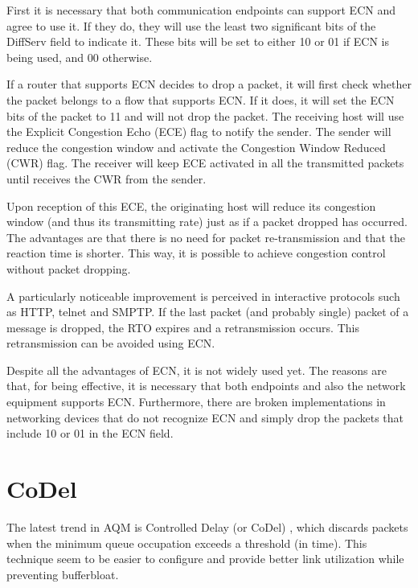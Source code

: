 First it is necessary that both communication endpoints can support ECN and agree to use it.
If they do, they will use the least two significant bits of the DiffServ field to indicate it.
These bits will be set to either 10 or 01 if ECN is being used, and 00 otherwise.

If a router that supports ECN decides to drop a packet, it will first check whether the packet belongs to a flow that supports ECN.
If it does, it will set the ECN bits of the packet to 11 and will not drop the packet.
The receiving host will use the Explicit Congestion Echo (ECE) flag to notify the sender.
The sender will reduce the congestion window and activate the Congestion Window Reduced (CWR) flag.
The receiver will keep ECE activated in all the transmitted packets until receives the CWR from the sender.

Upon reception of this ECE, the originating host will reduce its congestion window (and thus its transmitting rate) just as if a packet dropped has occurred.
The advantages are that there is no need for packet re-transmission and that the reaction time is shorter.
This way, it is possible to achieve congestion control without packet dropping.

A particularly noticeable improvement is perceived in interactive protocols such as HTTP, telnet and SMPTP.
If the last packet (and probably single) packet of a message is dropped, the RTO expires and a retransmission occurs.
This retransmission can be avoided using ECN.

Despite all the advantages of ECN, it is not widely used yet.
The reasons are that, for being effective, it is necessary that both endpoints and also the network equipment supports ECN.
Furthermore, there are broken implementations in networking devices that do not recognize ECN and simply drop the packets that include 10 or 01 in the ECN field.

\section{CoDel}
The latest trend in AQM is Controlled Delay (or CoDel) \cite{nichols2012cqd}, which discards packets when the minimum queue occupation exceeds a threshold (in time).
This technique seem to be easier to configure and provide better link utilization while preventing bufferbloat.
